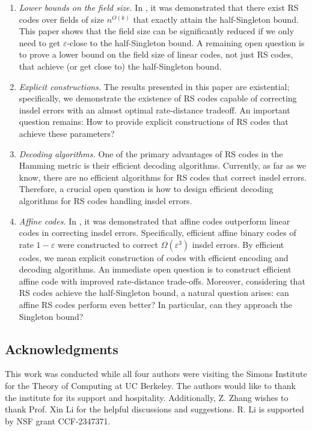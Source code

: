 \documentclass[11pt]{article}
\theoremstyle{plain}
\theoremstyle{definition}
\theoremstyle{remark}
\begin{document}
\begin{enumerate}
    \item  \emph{Lower bounds on the field size.} In \cite{con2023reed}, it was demonstrated that there exist RS codes over fields of size $n^{O(k)}$ that exactly attain the half-Singleton bound. This paper shows that the field size can be significantly reduced if we only need to get $\varepsilon$-close to the half-Singleton bound. A remaining open question is to prove a lower bound on the field size of linear codes, not just RS codes, that achieve (or get close to) the half-Singleton bound.
 

    \item \emph{Explicit constructions.} The results presented in this paper are existential; specifically, we demonstrate the existence of RS codes capable of correcting insdel errors with an almost optimal rate-distance tradeoff. An important question remains: How to provide explicit constructions of RS codes that achieve these parameters?
    
    \item \emph{Decoding algorithms.} One of the primary advantages of RS codes in the Hamming metric is their efficient decoding algorithms. Currently, as far as we know, there are no efficient algorithms for RS codes that correct insdel errors. Therefore, a crucial open question is how to design efficient decoding algorithms for RS codes handling insdel errors.

     \item \emph{Affine codes.} In \cite[Theorem 1.5]{cheng2020efficient}, it was demonstrated that affine codes outperform linear codes in correcting insdel errors. Specifically, efficient affine binary codes of rate $1-\varepsilon$ were constructed to correct $\Omega(\varepsilon^3)$ insdel errors. By efficient codes, we mean explicit construction of codes with efficient encoding and decoding algorithms. An immediate open question is to construct efficient affine code with improved rate-distance trade-offs. Moreover, considering that RS codes achieve the half-Singleton bound, a natural question arises: can affine RS codes perform even better? In particular, can they approach the Singleton bound? 
\end{enumerate}
\subsection*{Acknowledgments}
This work was conducted while all four authors were visiting the Simons Institute for the Theory of Computing at UC Berkeley. The authors would like to thank the institute for its support and hospitality. Additionally, Z. Zhang wishes to thank Prof. Xin Li for the helpful discussions and suggestions. R. Li is supported by NSF grant CCF-2347371.
\end{document}
